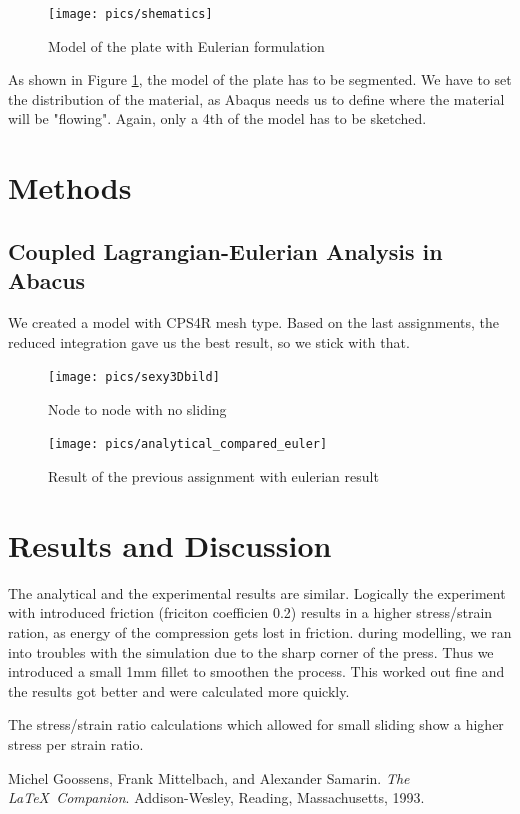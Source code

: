 \documentclass[12pt]{article}
\begin{document}
\begin{figure}[!htb]
  \centering
  \texttt{[image: pics/shematics]}
  \caption{Model of the plate with Eulerian formulation}
  \label{fig:1}
\end{figure}

\noindent As shown in Figure \ref{fig:1}, the model of the plate has to be segmented. We have to set the distribution of the material, as Abaqus needs us to define where the material will be "flowing". Again, only a 4th of the model has to be sketched.

\newpage
\section{Methods}

\subsection{Coupled Lagrangian-Eulerian Analysis in Abacus}

We created a model with CPS4R mesh type. Based on the last assignments, the reduced integration
gave us the best result, so we stick with that.

\begin{figure}[!htb]
  \centering
  \texttt{[image: pics/sexy3Dbild]}
  \caption{Node to node with no sliding}
  \label{fig:2}
\end{figure}

\begin{figure}[!htb]
  \centering
  \texttt{[image: pics/analytical\_compared\_euler]}
  \caption{Result of the previous assignment with eulerian result}
  \label{fig:3}
\end{figure}


\pagebreak
\section{Results and Discussion}

The analytical and the experimental results are similar.
Logically the experiment with introduced friction (friciton coefficien 0.2) results in a higher
stress/strain ration, as energy of the compression gets lost in friction. 
during modelling, we ran into troubles with the simulation due to the sharp corner of the press.
Thus we introduced a small 1mm fillet to smoothen the process. This worked out fine and the results 
got better and were calculated more quickly.

The stress/strain ratio calculations which allowed for small sliding show a higher stress per strain ratio.


\pagebreak
\begin{thebibliography}{9}
  Michel Goossens, Frank Mittelbach, and Alexander Samarin. 
  \textit{The \LaTeX\ Companion}. 
  Addison-Wesley, Reading, Massachusetts, 1993.
\end{thebibliography}
\end{document}
